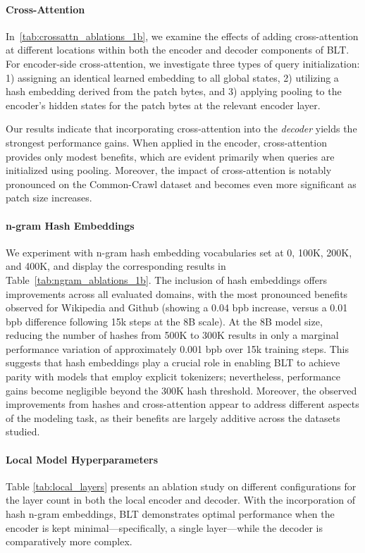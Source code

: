 \paragraph{Cross-Attention} 
In~\autoref{tab:crossattn_ablations_1b}, we examine the effects of adding cross-attention at different locations within both the encoder and decoder components of {\textsc BLT}. For encoder-side cross-attention, we investigate three types of query initialization: 1) assigning an identical learned embedding to all global states, 2) utilizing a hash embedding derived from the patch bytes, and 3) applying pooling to the encoder's hidden states for the patch bytes at the relevant encoder layer.

Our results indicate that incorporating cross-attention into the \textit{decoder} yields the strongest performance gains. When applied in the encoder, cross-attention provides only modest benefits, which are evident primarily when queries are initialized using pooling. Moreover, the impact of cross-attention is notably pronounced on the Common-Crawl dataset and becomes even more significant as patch size increases.

\paragraph{n-gram Hash Embeddings} 

We experiment with n-gram hash embedding vocabularies set at 0, 100K, 200K, and 400K, and display the corresponding results in Table~\ref{tab:ngram_ablations_1b}. The inclusion of hash embeddings offers improvements across all evaluated domains, with the most pronounced benefits observed for Wikipedia and Github (showing a 0.04 bpb increase, versus a 0.01 bpb difference following 15k steps at the 8B scale). At the 8B model size, reducing the number of hashes from 500K to 300K results in only a marginal performance variation of approximately 0.001 bpb over 15k training steps. This suggests that hash embeddings play a crucial role in enabling {\textsc BLT} to achieve parity with models that employ explicit tokenizers; nevertheless, performance gains become negligible beyond the 300K hash threshold. Moreover, the observed improvements from hashes and cross-attention appear to address different aspects of the modeling task, as their benefits are largely additive across the datasets studied.

\paragraph{Local Model Hyperparameters} Table \ref{tab:local_layers} presents an ablation study on different configurations for the layer count in both the local encoder and decoder. With the incorporation of hash n-gram embeddings, {\textsc BLT} demonstrates optimal performance when the encoder is kept minimal—specifically, a single layer—while the decoder is comparatively more complex.

